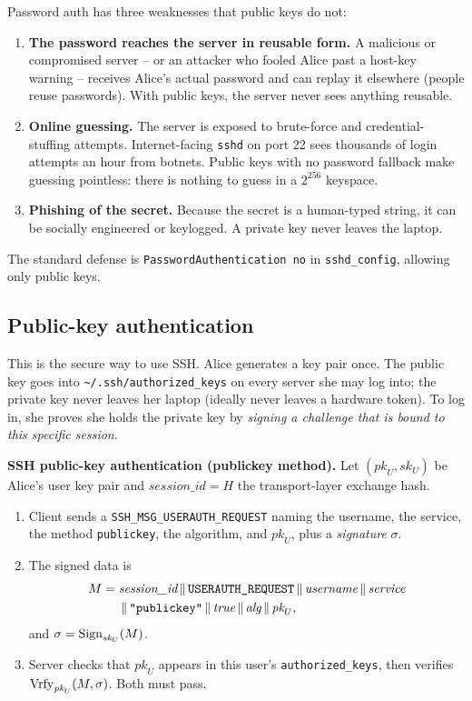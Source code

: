 \begin{trapbox}
Password auth has three weaknesses that public keys do not:
\begin{enumerate}
  \item \textbf{The password reaches the server in reusable form.} A malicious or compromised server -- or an attacker who fooled Alice past a host-key warning -- receives Alice's actual password and can replay it elsewhere (people reuse passwords). With public keys, the server never sees anything reusable.
  \item \textbf{Online guessing.} The server is exposed to brute-force and credential-stuffing attempts. Internet-facing \texttt{sshd} on port 22 sees thousands of login attempts an hour from botnets. Public keys with no password fallback make guessing pointless: there is nothing to guess in a $2^{256}$ keyspace.
  \item \textbf{Phishing of the secret.} Because the secret is a human-typed string, it can be socially engineered or keylogged. A private key never leaves the laptop.
\end{enumerate}
The standard defense is \texttt{PasswordAuthentication no} in \texttt{sshd\_config}, allowing only public keys.
\end{trapbox}

\subsection{Public-key authentication}

This is the secure way to use SSH. Alice generates a key pair once. The public key goes into \texttt{\textasciitilde/.ssh/authorized\_keys} on every server she may log into; the private key never leaves her laptop (ideally never leaves a hardware token). To log in, she proves she holds the private key by \emph{signing a challenge that is bound to this specific session}.

\begin{formalbox}
\textbf{SSH public-key authentication (publickey method).} Let $(\textit{pk}_U,\textit{sk}_U)$ be Alice's user key pair and $\textit{session\_id} = H$ the transport-layer exchange hash.
\begin{enumerate}
  \item Client sends a \texttt{SSH\_MSG\_USERAUTH\_REQUEST} naming the username, the service, the method \texttt{publickey}, the algorithm, and $\textit{pk}_U$, plus a \emph{signature} $\sigma$.
  \item The signed data is
  \[
    \begin{aligned}
    M = \;&\textit{session\_id} \,\|\, \texttt{USERAUTH\_REQUEST} \,\|\, \textit{username} \,\|\, \textit{service} \\
          &\,\|\, \texttt{"publickey"} \,\|\, \textit{true} \,\|\, \textit{alg} \,\|\, \textit{pk}_U,
    \end{aligned}
  \]
  and $\sigma = \operatorname{Sign}_{\textit{sk}_U}(M)$.
  \item Server checks that $\textit{pk}_U$ appears in this user's \texttt{authorized\_keys}, then verifies $\operatorname{Vrfy}_{\textit{pk}_U}(M,\sigma)$. Both must pass.
\end{enumerate}
\end{formalbox}

